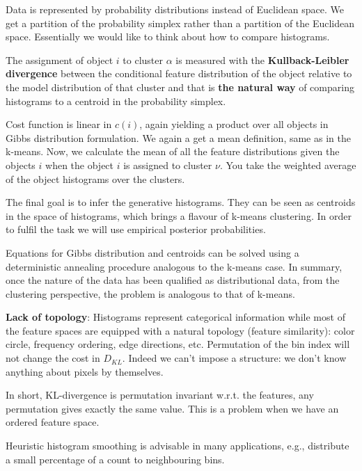 \documentclass[12pt]{article}
\begin{document}
\par Data is represented by probability distributions instead of Euclidean space. We get a partition of the probability simplex rather than a partition of the Euclidean space. Essentially we would like to think about how to compare histograms.
\par The assignment of object $i$ to cluster $\alpha$ is measured with the \textbf{Kullback-Leibler divergence} between the conditional feature distribution of the object relative to the model distribution of that cluster and that is \textbf{the natural way} of comparing histograms to a centroid in the probability simplex.
\par Cost function is linear in $c(i)$, again yielding a product over all objects in Gibbs distribution formulation. We again a get a mean definition, same as in the k-means. Now, we calculate the mean of all the feature distributions given the objects $i$ when the object $i$ is assigned to cluster $\nu$. You take the weighted average of the object histograms over the clusters.
\par The final goal is to infer the generative histograms. They can be seen as centroids in the space of histograms, which brings a flavour of k-means clustering. In order to fulfil the task we will use empirical posterior probabilities.
\par Equations for Gibbs distribution and centroids can be solved using a deterministic annealing procedure analogous to the k-means case. In summary, once the nature of the data has been qualified as distributional data, from the clustering perspective, the problem is analogous to that of k-means.
\par \textbf{Lack of topology}: Histograms represent categorical information while most of the feature spaces are equipped with a natural topology (feature similarity): color circle, frequency ordering, edge directions, etc. Permutation of the bin index will not change the cost in $D_{KL}$. Indeed we can't impose a structure: we don't know anything about pixels by themselves.
\par In short, KL-divergence is permutation invariant w.r.t. the features, any permutation gives exactly the same value. This is a problem when we have an ordered feature space.
\par Heuristic histogram smoothing is advisable in many applications, e.g., distribute a small percentage of a count to neighbouring bins.
\end{document}
